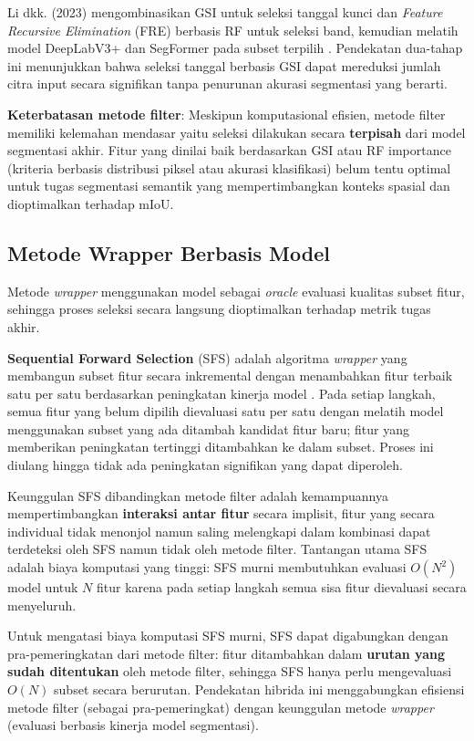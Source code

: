 Li dkk. (2023) mengombinasikan GSI untuk seleksi tanggal kunci dan \textit{Feature Recursive Elimination} (FRE) berbasis RF untuk seleksi band, kemudian melatih model DeepLabV3+ dan SegFormer pada subset terpilih \cite{li2023hetao}.
Pendekatan dua-tahap ini menunjukkan bahwa seleksi tanggal berbasis GSI dapat mereduksi jumlah citra input secara signifikan tanpa penurunan akurasi segmentasi yang berarti.

\textbf{Keterbatasan metode filter}: Meskipun komputasional efisien, metode filter memiliki kelemahan mendasar yaitu seleksi dilakukan secara \textbf{terpisah} dari model segmentasi akhir.
Fitur yang dinilai baik berdasarkan GSI atau RF importance (kriteria berbasis distribusi piksel atau akurasi klasifikasi) belum tentu optimal untuk tugas segmentasi semantik yang mempertimbangkan konteks spasial dan dioptimalkan terhadap mIoU.

\subsection{Metode Wrapper Berbasis Model}
Metode \textit{wrapper} menggunakan model sebagai \textit{oracle} evaluasi kualitas subset fitur, sehingga proses seleksi secara langsung dioptimalkan terhadap metrik tugas akhir.

\textbf{Sequential Forward Selection} (SFS) adalah algoritma \textit{wrapper} yang membangun subset fitur secara inkremental dengan menambahkan fitur terbaik satu per satu berdasarkan peningkatan kinerja model \cite{rs15215203}.
Pada setiap langkah, semua fitur yang belum dipilih dievaluasi satu per satu dengan melatih model menggunakan subset yang ada ditambah kandidat fitur baru; fitur yang memberikan peningkatan tertinggi ditambahkan ke dalam subset.
Proses ini diulang hingga tidak ada peningkatan signifikan yang dapat diperoleh.

Keunggulan SFS dibandingkan metode filter adalah kemampuannya mempertimbangkan \textbf{interaksi antar fitur} secara implisit, fitur yang secara individual tidak menonjol namun saling melengkapi dalam kombinasi dapat terdeteksi oleh SFS namun tidak oleh metode filter.
Tantangan utama SFS adalah biaya komputasi yang tinggi: SFS murni membutuhkan evaluasi $O(N^2)$ model untuk $N$ fitur karena pada setiap langkah semua sisa fitur dievaluasi secara menyeluruh.

Untuk mengatasi biaya komputasi SFS murni, SFS dapat digabungkan dengan pra-pemeringkatan dari metode filter: fitur ditambahkan dalam \textbf{urutan yang sudah ditentukan} oleh metode filter, sehingga SFS hanya perlu mengevaluasi $O(N)$ subset secara berurutan.
Pendekatan hibrida ini menggabungkan efisiensi metode filter (sebagai pra-pemeringkat) dengan keunggulan metode \textit{wrapper} (evaluasi berbasis kinerja model segmentasi).

